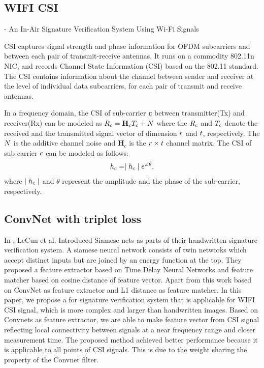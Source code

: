 \documentclass[runningheads]{llncs}
\begin{document}
\subsection{WIFI CSI}
- An In-Air Signature Verification System Using Wi-Fi Signals 

CSI captures signal strength and phase information for OFDM subcarriers and between each pair of transmit-receive antennas.
It runs on a commodity 802.11n NIC, and records Channel State Information (CSI) based on the 802.11 standard.
The CSI contains information about the channel between sender and receiver at the level of individual data subcarriers, for each pair of transmit and receive antennas.

In a frequency domain, the CSI of sub-carrier $\mathbf{c}$ between transmitter(Tx) and receiver(Rx) can be modeled as 
$\mathnormal{R}_{c} = \mathbf{H}_{c}\mathnormal{T}_{c} +\mathnormal{N}$ where the $\mathnormal{R}_{c}$ and $\mathnormal{T}_{c}$  denote the received and the transmitted signal vector of dimension $\mathnormal{r}$ and $\mathnormal{t}$, respectively. The $\mathnormal{N}$ is the additive channel noise and $\mathbf{H}_{c}$ is the $\mathnormal{r}\times\mathnormal{t}$ channel matrix. The CSI of sub-carrier $\mathnormal{c}$ can be modeled as follows:
\begin{equation}
    \mathnormal{h}_{c} = \mid\mathnormal{h}_{c}\mid\mathnormal{e}^{\angle\theta},
\end{equation}
where $\mid\mathnormal{h}_{c}\mid$ and $\theta$ represent the amplitude and the phase of the sub-carrier, respectively.

\subsection{ConvNet with triplet loss}

In \cite{bromley1994signature}, LeCun et al. Introduced Siamese nets as parts of their handwritten signature verification system. 
A siamese neural network consists of twin networks which accept distinct inputs but are joined by an energy function at the top.\cite{koch2015siamese}
They proposed a feature extractor based on Time Delay Neural Networks\cite{lang1990time} and feature matcher based on cosine distance of feature vector. Apart from this work based on ConvNet as feature extractor and L1 distance as feature matcher.
In this paper, we propose a for signature verification system that is applicable for WIFI CSI signal, which is more complex and larger than handwritten images. 
Based on Convnets as feature extractor, we are able to make feature vector from CSI signal reflecting local connectivity between signals at a near frequency range and closer measurement time. 
The proposed method achieved better performance because it is applicable to all points of CSI signals. This is due to the weight sharing the property of the Convnet filter.
\end{document}
